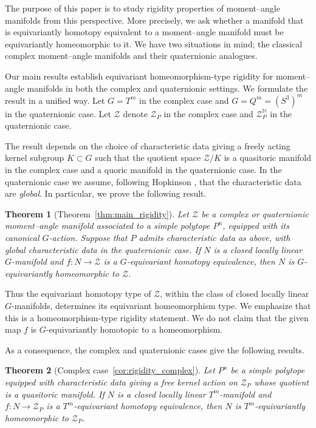 \documentclass[11pt,a4paper]{article}
\numberwithin{equation}{section}
\newtheorem*{theorem}{Theorem}
\theoremstyle{named}
\begin{document}
\medskip

The purpose of this paper is to study rigidity properties of moment--angle manifolds from this perspective. More precisely, we ask whether a manifold that is equivariantly homotopy equivalent to a moment--angle manifold must be equivariantly homeomorphic to it. We have two situations in mind; the classical complex moment--angle manifolds and their quaternionic analogues.

\medskip

Our main results establish equivariant homeomorphism-type rigidity for moment--angle manifolds in both the complex and quaternionic settings. We formulate the result in a unified way. Let \(G=T^m\) in the complex case and \(G=Q^m=(S^3)^m\) in the quaternionic case. Let \(\mathcal Z\) denote \(\mathcal Z_P\) in the complex case and \(\mathcal Z_P^{\mathbb H}\) in the quaternionic case.

The result depends on the choice of characteristic data giving a freely acting kernel subgroup \(K\subset G\) such that the quotient space \(\mathcal Z/K\) is a quasitoric manifold in the complex case and a quoric manifold in the quaternionic case. In the quaternionic case we assume, following Hopkinson \cite{ho}, that the characteristic data are \emph{global}. In particular, we prove the following result.

\begin{theorem}[Theorem~\ref{thm:main_rigidity}]
Let \(\mathcal Z\) be a complex or quaternionic moment--angle manifold associated to a simple polytope \(P^n\), equipped with its canonical \(G\)-action. Suppose that \(P\) admits characteristic data as above, with global characteristic data in the quaternionic case. If \(N\) is a closed locally linear \(G\)-manifold and \(f:N\longrightarrow \mathcal Z \) is a \(G\)-equivariant homotopy equivalence, then \(N\) is \(G\)-equivariantly homeomorphic to \(\mathcal Z\).
\end{theorem}

Thus the equivariant homotopy type of \(\mathcal Z\), within the class of closed locally linear \(G\)-manifolds, determines its equivariant homeomorphism type. We emphasize that this is a homeomorphism-type rigidity statement. We do not claim that the given map \(f\) is \(G\)-equivariantly homotopic to a homeomorphism.

As a consequence, the complex and quaternionic cases give the following results.

\begin{theorem}[Complex case~\ref{cor:rigidity_complex}]
Let \(P^n\) be a simple polytope equipped with characteristic data giving a free kernel action on \(\mathcal Z_P\) whose quotient is a quasitoric manifold. If \(N\) is a closed locally linear \(T^m\)-manifold and \(f:N\longrightarrow \mathcal Z_P\) is a \(T^m\)-equivariant homotopy equivalence, then \(N\) is \(T^m\)-equivariantly homeomorphic to \(\mathcal Z_P\).
\end{theorem}
\end{document}
